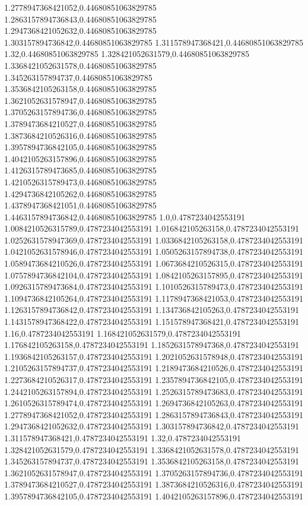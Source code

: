 1.2778947368421052,0.44680851063829785
1.2863157894736843,0.44680851063829785
1.2947368421052632,0.44680851063829785
1.303157894736842,0.44680851063829785
1.311578947368421,0.44680851063829785
1.32,0.44680851063829785
1.328421052631579,0.44680851063829785
1.3368421052631578,0.44680851063829785
1.345263157894737,0.44680851063829785
1.3536842105263158,0.44680851063829785
1.3621052631578947,0.44680851063829785
1.3705263157894736,0.44680851063829785
1.3789473684210527,0.44680851063829785
1.3873684210526316,0.44680851063829785
1.3957894736842105,0.44680851063829785
1.4042105263157896,0.44680851063829785
1.4126315789473685,0.44680851063829785
1.4210526315789473,0.44680851063829785
1.4294736842105262,0.44680851063829785
1.4378947368421051,0.44680851063829785
1.4463157894736842,0.44680851063829785
1.0,0.4787234042553191
1.0084210526315789,0.4787234042553191
1.016842105263158,0.4787234042553191
1.0252631578947369,0.4787234042553191
1.0336842105263158,0.4787234042553191
1.0421052631578946,0.4787234042553191
1.0505263157894738,0.4787234042553191
1.0589473684210526,0.4787234042553191
1.0673684210526315,0.4787234042553191
1.0757894736842104,0.4787234042553191
1.0842105263157895,0.4787234042553191
1.0926315789473684,0.4787234042553191
1.1010526315789473,0.4787234042553191
1.1094736842105264,0.4787234042553191
1.1178947368421053,0.4787234042553191
1.1263157894736842,0.4787234042553191
1.134736842105263,0.4787234042553191
1.1431578947368422,0.4787234042553191
1.151578947368421,0.4787234042553191
1.16,0.4787234042553191
1.168421052631579,0.4787234042553191
1.176842105263158,0.4787234042553191
1.1852631578947368,0.4787234042553191
1.1936842105263157,0.4787234042553191
1.2021052631578948,0.4787234042553191
1.2105263157894737,0.4787234042553191
1.2189473684210526,0.4787234042553191
1.2273684210526317,0.4787234042553191
1.2357894736842105,0.4787234042553191
1.2442105263157894,0.4787234042553191
1.2526315789473683,0.4787234042553191
1.2610526315789474,0.4787234042553191
1.2694736842105263,0.4787234042553191
1.2778947368421052,0.4787234042553191
1.2863157894736843,0.4787234042553191
1.2947368421052632,0.4787234042553191
1.303157894736842,0.4787234042553191
1.311578947368421,0.4787234042553191
1.32,0.4787234042553191
1.328421052631579,0.4787234042553191
1.3368421052631578,0.4787234042553191
1.345263157894737,0.4787234042553191
1.3536842105263158,0.4787234042553191
1.3621052631578947,0.4787234042553191
1.3705263157894736,0.4787234042553191
1.3789473684210527,0.4787234042553191
1.3873684210526316,0.4787234042553191
1.3957894736842105,0.4787234042553191
1.4042105263157896,0.4787234042553191
